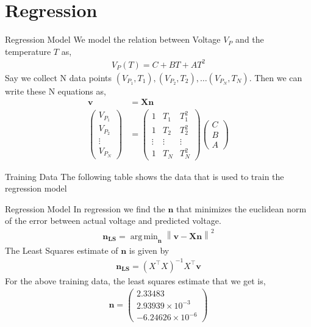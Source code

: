 \documentclass{beamer}
\DeclareMathOperator*{\argmin}{arg\,min}
\theoremstyle{remark}
\providecommand{\norm}[1]{\left\lVert#1\right\rVert}
\newcommand{\myvec}[1]{\ensuremath{\begin{pmatrix}#1\end{pmatrix}}}
\renewcommand{\vec}[1]{\mathbf{\boldsymbol{#1}}}
\begin{document}
\section{Regression}
\begin{frame}{Regression Model}
	We model the relation between Voltage $V_P$ and the temperature $T$ as,
	\begin{align}
		V_P(T) = C+BT+AT^2
	\end{align}
Say we collect N data points $(V_{P_1},T_1),(V_{P_2},T_2),\hdots (V_{P_N},T_N)$. Then we can write these N equations as,
	\begin{align}
		\vec{v} &= \vec{X} \vec{n}\\ 
		\myvec{V_{P_1}\\V_{P_2}\\\vdots \\ V_{P_N}} &= \myvec{1& T_1 & T_1^{2}\\ 1& T_2 & T_2^{2}\\ \vdots & \vdots & \vdots  \\ 1& T_N & T_N^{2}} \myvec{C\\ B\\ A}
	\end{align}
\end{frame}
\begin{frame}{Training Data}
    The following table shows the data that is used to train the regression model
	\begin{table}[!ht]
    	\centering
    	
    	\caption{Training data}
    	\label{tab:train}
	\end{table}
\end{frame}
\begin{frame}{Regression Model}
	In regression we find the $\vec{n}$ that minimizes the euclidean norm of the error between actual voltage and predicted voltage.
	\begin{align}
		\vec{n_{LS}} = \argmin_{\vec{n}} \norm{\vec{v}-\vec{X}\vec{n}}^2
	\end{align}
	The Least Squares estimate of $\vec{n}$ is given by
	\begin{align}
		\vec{n_{LS}} = (X^{\top}X)^{-1}X^{\top}\vec{v}
	\end{align}
	For the above training data, the least squares estimate that we get is,
	\begin{align}
		\vec{n} = \myvec{2.33483\\ 2.93939\times10^{-3}\\-6.24626\times 10^{-6}}
	\end{align}
\end{frame}
\end{document}
